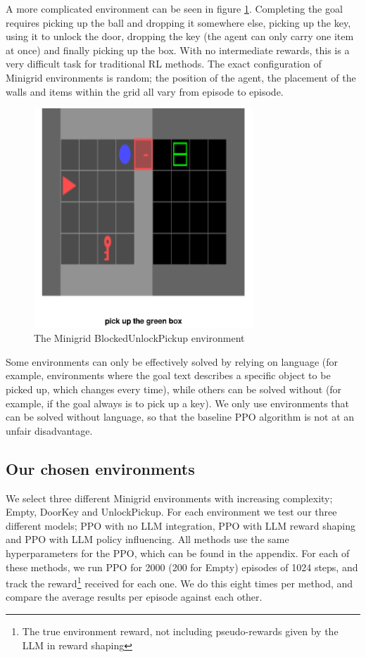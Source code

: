 \documentclass[conference]{IEEEtran}
\begin{document}
A more complicated environment can be seen in figure \ref{blockedunlockpickupenv}. Completing the goal requires picking up the ball and dropping it somewhere else, picking up the key, using it to unlock the door, dropping the key (the agent can only carry one item at once) and finally picking up the box. With no intermediate rewards, this is a very difficult task for traditional RL methods. The exact configuration of Minigrid environments is random; the position of the agent, the placement of the walls and items within the grid all vary from episode to episode.

\begin{figure}[h]
\centerline{\includegraphics[width=3.25in]{figure/blockedunlockpickupenv.png}}
\caption{The Minigrid BlockedUnlockPickup environment}
\label{blockedunlockpickupenv}
\end{figure}

Some environments can only be effectively solved by relying on language (for example, environments where the goal text describes a specific object to be picked up, which changes every time), while others can be solved without (for example, if the goal always is to pick up a key). We only use environments that can be solved without language, so that the baseline PPO algorithm is not at an unfair disadvantage.

\subsection{Our chosen environments}

We select three different Minigrid environments with increasing complexity; Empty, DoorKey and UnlockPickup. For each environment we test our three different models; PPO with no LLM integration, PPO with LLM reward shaping and PPO with LLM policy influencing. All methods use the same hyperparameters for the PPO, which can be found in the appendix. For each of these methods, we run PPO for 2000 (200 for Empty) episodes of 1024 steps, and track the reward\footnote{The true environment reward, not including pseudo-rewards given by the LLM in reward shaping} received for each one. We do this eight times per method, and compare the average results per episode against each other.
\end{document}
